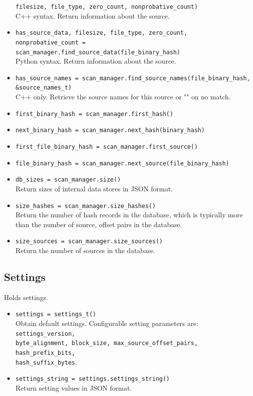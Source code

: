 \documentclass[11pt,fleqn]{article} %
\begin{document}
\begin{itemize}
\verb+filesize, file_type, zero_count, nonprobative_count)+\\
C++ syntax. Return information about the source.
\item \verb+has_source_data, filesize, file_type, zero_count, nonprobative_count =+\\
\verb+scan_manager.find_source_data(file_binary_hash)+\\
Python syntax. Return information about the source.
\item \verb+has_source_names = scan_manager.find_source_names(file_binary_hash,+\\
\verb+&source_names_t)+\\
C++ only. Retrieve the source names for this source or "" on no match.
\item \verb+first_binary_hash = scan_manager.first_hash()+
\item \verb+next_binary_hash = scan_manager.next_hash(binary_hash)+
\item \verb+first_file_binary_hash = scan_manager.first_source()+
\item \verb+file_binary_hash = scan_manager.next_source(file_binary_hash)+
\item \verb+db_sizes = scan_manager.size()+\\
Return sizes of internal data stores in JSON format.
\item \verb+size_hashes = scan_manager.size_hashes()+\\
Return the number of hash records in the database, which is typically more than the number of source, offset pairs in the database.
\item \verb+size_sources = scan_manager.size_sources()+\\
Return the number of sources in the database.
\end{itemize}

\subsection{Settings}
Holds \hdb settings.

\begin{itemize}
\item \verb+settings = settings_t()+\\
Obtain default settings. Configurable setting parameters are: \verb+settings_version,+\\
\verb+byte_alignment, block_size, max_source_offset_pairs, hash_prefix_bits,+\\
\verb+hash_suffix_bytes+.
\item \verb+settings_string = settings.settings_string()+\\
Return setting values in JSON format.
\end{itemize}
\end{document}
